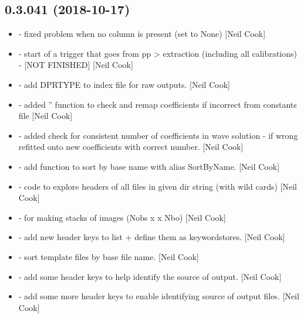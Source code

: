\documentclass[a4paper,10pt,english]{report}
\begin{document}
\subsection{0.3.041 (2018-10-17)}
\label{\detokenize{misc/changelog:id290}}\begin{itemize}
\item {} 
 - fixed problem when no column is present (set to
None) {[}Neil Cook{]}

\item {} 
 - start of a trigger that goes from pp \textendash{}\textgreater{}
extraction (including all calibrations) - {[}NOT FINISHED{]} {[}Neil Cook{]}

\item {} 
 - add DPRTYPE to index file for raw outputs. {[}Neil
Cook{]}

\item {} 
 - added ” function to check
and remap coefficients if incorrect from constants file
 {[}Neil Cook{]}

\item {} 
  - added check for consistent number of coefficients
in wave solution - if wrong refitted onto new coefficients with
correct number. {[}Neil Cook{]}

\item {} 
 - add function to sort by base name  with
alias SortByName. {[}Neil Cook{]}

\item {} 
 - code to explore headers of all files in given dir
string (with wild cards) {[}Neil Cook{]}

\item {} 
 - for making stacks of images (Nobs x  x
Nbo) {[}Neil Cook{]}

\item {} 
 - add new header keys to list + define them as
keywordstores. {[}Neil Cook{]}

\item {} 
 - sort template files by base file name. {[}Neil
Cook{]}

\item {} 
 - add some header keys to help identify the
source of output. {[}Neil Cook{]}

\item {} 
 - add some more header keys to enable
identifying source of output files. {[}Neil Cook{]}

\end{itemize}
\end{document}
